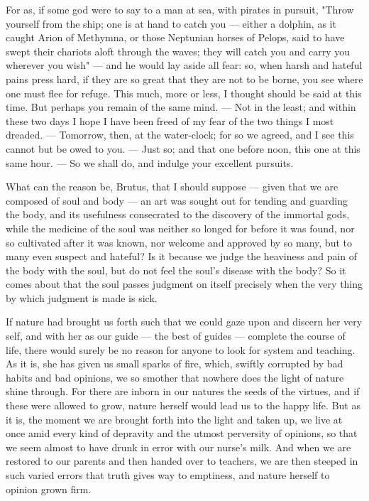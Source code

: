  For as, if some god were to say to a man at sea, with pirates in pursuit, "Throw yourself from the ship; one is at hand to catch you — either a dolphin, as it caught Arion of Methymna, or those Neptunian horses of Pelops, said to have swept their chariots aloft through the waves; they will catch you and carry you wherever you wish" — and he would lay aside all fear: so, when harsh and hateful pains press hard, if they are so great that they are not to be borne, you see where one must flee for refuge. This much, more or less, I thought should be said at this time. But perhaps you remain of the same mind. — Not in the least; and within these two days I hope I have been freed of my fear of the two things I most dreaded. — Tomorrow, then, at the water-clock; for so we agreed, and I see this cannot but be owed to you. — Just so; and that one before noon, this one at this same hour. — So we shall do, and indulge your excellent pursuits.


 What can the reason be, Brutus, that I should suppose — given that we are composed of soul and body — an art was sought out for tending and guarding the body, and its usefulness consecrated to the discovery of the immortal gods, while the medicine of the soul was neither so longed for before it was found, nor so cultivated after it was known, nor welcome and approved by so many, but to many even suspect and hateful? Is it because we judge the heaviness and pain of the body with the soul, but do not feel the soul's disease with the body? So it comes about that the soul passes judgment on itself precisely when the very thing by which judgment is made is sick.

 If nature had brought us forth such that we could gaze upon and discern her very self, and with her as our guide — the best of guides — complete the course of life, there would surely be no reason for anyone to look for system and teaching. As it is, she has given us small sparks of fire, which, swiftly corrupted by bad habits and bad opinions, we so smother that nowhere does the light of nature shine through. For there are inborn in our natures the seeds of the virtues, and if these were allowed to grow, nature herself would lead us to the happy life. But as it is, the moment we are brought forth into the light and taken up, we live at once amid every kind of depravity and the utmost perversity of opinions, so that we seem almost to have drunk in error with our nurse's milk. And when we are restored to our parents and then handed over to teachers, we are then steeped in such varied errors that truth gives way to emptiness, and nature herself to opinion grown firm.

